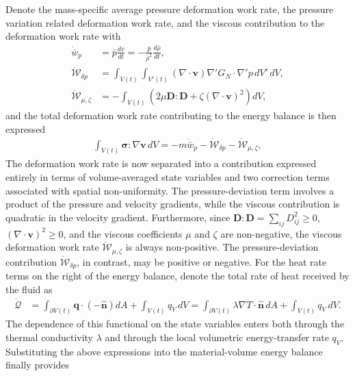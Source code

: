 Denote the mass-specific average pressure deformation work rate, the pressure variation related deformation work rate, and the viscous contribution to the deformation work rate with
\begin{align}
    \label{eq:dot-w_p-expressions}
    \dot{\bar w}_p
    &=
    \bar p\frac{d\bar v}{dt}
    =
    -\frac{\bar p}{\bar{\rho}^2}
    \frac{d\bar{\rho}}{dt},\\
    \dot{\mathcal W}_{\delta p}
    &=
    \int_{V(t)}
    \int_{V'(t)}
    (\nabla\cdot\bm v)
    \nabla'G_N\cdot\nabla'p\,
    dV'\,dV,\\
    \dot{\mathcal W}_{\mu,\zeta}
    &=
    -\int_{V(t)}
    \left(
        2\mu\bm D:\bm D
        +
        \zeta(\nabla\cdot\bm v)^2
    \right)dV,
\end{align}
and the total deformation work rate contributing to the energy balance is then expressed
\begin{align}
    \int_{V(t)}
    \bm{\sigma}:\nabla\bm v\,dV
    =
    -m\dot{\bar w}_p
    -\dot{\mathcal W}_{\delta p}
    -\dot{\mathcal W}_{\mu,\zeta},
    \label{eq:stress-work-averaged}
\end{align}
The deformation work rate is now separated into a contribution expressed entirely in terms of volume-averaged state variables and two correction terms associated with spatial non-uniformity. The pressure-deviation term involves a product of the pressure and velocity gradients, while the viscous contribution is quadratic in the velocity gradient. Furthermore, since $\bm{D}:\bm{D}=\sum_{ij}D_{ij}^2\geq 0$, $(\nabla\cdot\bm{v})^2\geq 0$, and the viscous coefficients $\mu$ and $\zeta$ are non-negative, the viscous deformation work rate $\dot{\mathcal{W}}_{\mu,\zeta}$ is always non-positive. The pressure-deviation contribution $\dot{\mathcal{W}}_{\delta p}$, in contrast, may be positive or negative.
For the heat rate terms on the right of the energy balance, denote the total rate of heat received by the fluid as
\begin{align}
    \dot{\mathcal Q}
    &=
    \int_{\partial V(t)}
    \bm{q}\cdot(-\bm{\hat{n}})dA
    +
    \int_{V(t)}q_V\,dV=
    \int_{\partial V(t)}
    \lambda\nabla T\cdot\bm{\hat n}\,dA
    +
    \int_{V(t)}q_V\,dV.
\end{align}
The dependence of this functional on the state variables enters both through the thermal conductivity $\lambda$ and through the local volumetric energy-transfer rate $q_V$. Substituting the above expressions into the material-volume energy balance finally provides
